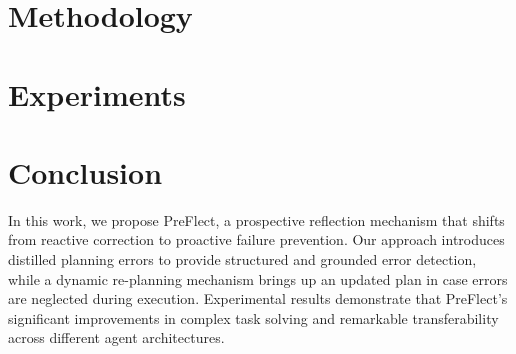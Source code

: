 \documentclass{article}
\theoremstyle{plain}
\theoremstyle{definition}
\theoremstyle{remark}
\newcommand{\method}{PreFlect\xspace}
\begin{document}
\section{Methodology}
\label{sec:method}






\section{Experiments}
\label{sec:experiment}



\section{Conclusion}
\label{sec:conclusion}

In this work, we propose \method, a prospective reflection mechanism that shifts from reactive correction to proactive failure prevention. Our approach introduces distilled planning errors to provide structured and grounded error detection, while a dynamic re-planning mechanism brings up an updated plan in case errors are neglected during execution. Experimental results demonstrate that \method's significant improvements in complex task solving and remarkable transferability across different agent architectures.




\end{document}
